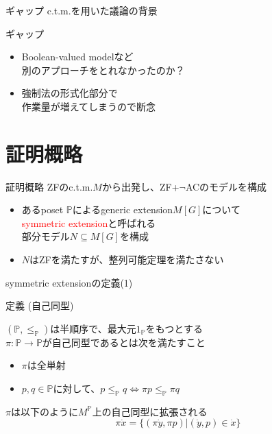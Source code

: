 \documentclass[17pt,aspectratio=169]{beamer}
\newcommand{\Pbb}{\mathbb{P}}
\begin{document}
\begin{frame}{ギャップ}
    c.t.m.を用いた議論の背景
\end{frame}

\begin{frame}{ギャップ}
    \begin{itemize} 
        \item Boolean-valued modelなど\\
              別のアプローチをとれなかったのか？
        \item 強制法の形式化部分で\\作業量が増えてしまうので断念
    \end{itemize}    
\end{frame}

\section{証明概略}
\begin{frame}{証明概略}
    ZFのc.t.m.$M$から出発し、ZF+$\neg$ACのモデルを構成
    \begin{itemize}
        \item あるposet $\mathbb{P}$によるgeneric extension$M[G]$について\\
              \textcolor{red}{symmetric extension}と呼ばれる\\
              部分モデル$N \subseteq M[G]$を構成
        \item $N$はZFを満たすが、整列可能定理を満たさない
    \end{itemize}
\end{frame}

\begin{frame}{symmetric extensionの定義(1)}
    \begin{itembox}[l]{定義 (自己同型)}
        {\small
            $(\Pbb, \le_{\Pbb})$は半順序で、最大元$1_{\Pbb}$をもつとする \\
            $\pi : \Pbb \rightarrow \Pbb$が自己同型であるとは次を満たすこと
            \begin{itemize}
                \setlength{\itemsep}{3pt}
                \item $\pi$は全単射
                \item $p, q \in \Pbb$に対して、$p \le_{\Pbb} q \Leftrightarrow \pi p \le_{\Pbb} \pi q$
            \end{itemize}
            $\pi$は以下のように$M^\Pbb$上の自己同型に拡張される
            $$ \pi \dot{x} = \{ (\pi \dot{y}, \pi p) | (\dot{y}, p) \in \dot{x} \} $$
        }
    \end{itembox}
\end{frame}
\end{document}
